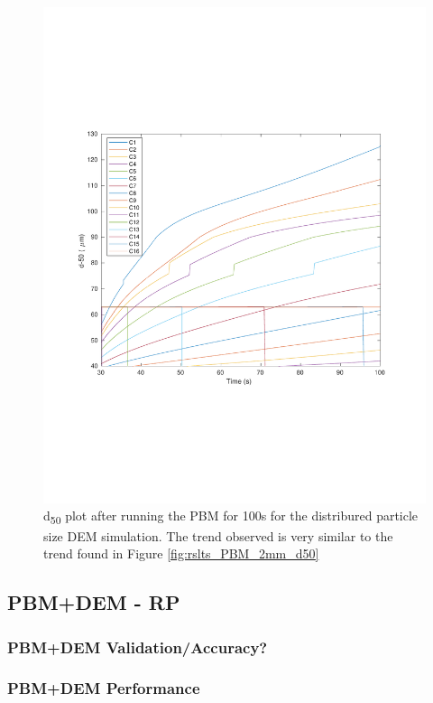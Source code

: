 \documentclass[preprint,11pt,authoryear]{elsarticle}
\begin{document}
\begin{figure}[H]
\centering
\includegraphics[scale=0.5]{rslts_pbm_d50_128_555.pdf}
\caption{d\textsubscript{50} plot after running the PBM for 100s for the distribured particle size DEM simulation. The trend observed is very similar to the trend found in Figure \ref{fig:rslts_PBM_2mm_d50}}
\label{fig:rslts_PBM_psd_d50}
\end{figure}


\subsection{PBM+DEM - RP} 
\subsubsection{PBM+DEM Validation/Accuracy?}
%	    
\subsubsection{PBM+DEM Performance}
%	
\end{document}
